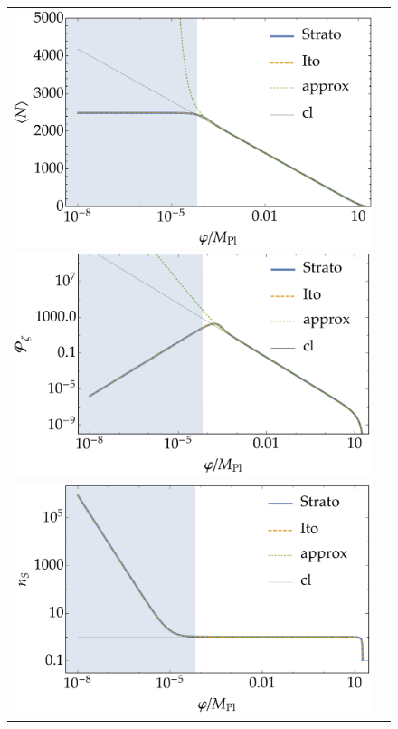 \documentclass[aps, prd
, preprint
, nofootinbib 
, superscriptaddress
, longbibliography
]{revtex4-1}
\begin{document}
\begin{figure}
	\centering
	\begin{tabular}{cc}
		\begin{minipage}{0.5\hsize}
			\centering
			\includegraphics[width=\hsize]{figs/N.pdf}
		\end{minipage}
		\begin{minipage}{0.5\hsize}
			\centering
			\includegraphics[width=\hsize]{figs/calP.pdf}
		\end{minipage} \\[100pt]
		\begin{minipage}{0.5\hsize}
			\centering
			\includegraphics[width=\hsize]{figs/ns.pdf}

\end{minipage}
\end{tabular}
\end{figure}
\end{document}

